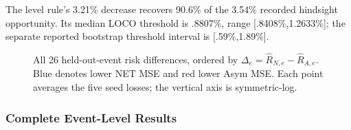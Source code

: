 The level rule's 3.21\% decrease recovers 90.6\% of the 3.54\% recorded hindsight opportunity. Its median LOCO threshold is .8807\%, range [.8408\%,1.2633\%]; the separate reported bootstrap threshold interval is [.59\%,1.89\%]. 

\begin{figure}[!htbp]
\centering
{}
\caption{All 26 held-out-event risk differences, ordered by $\Delta_e=\widehat R_{N,e}-\widehat R_{A,e}$. Blue denotes lower NET MSE and red lower Asym MSE. Each point averages the five seed losses; the vertical axis is symmetric-log.}
\label{fig:event_heterogeneity}
\end{figure}

\subsubsection{Complete Event-Level Results}
